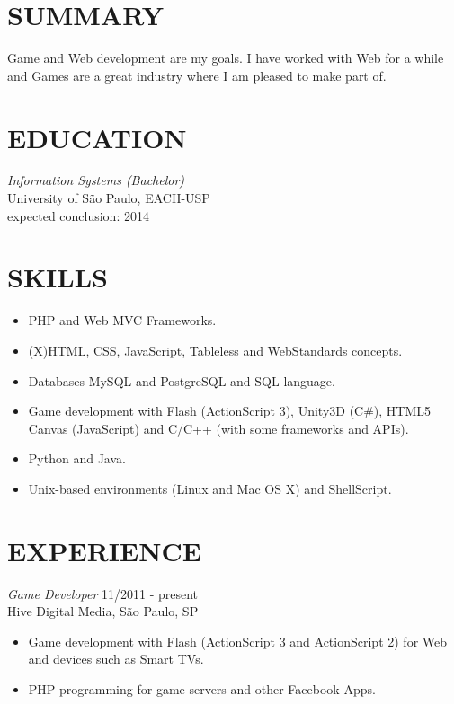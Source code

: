 \documentclass[line,margin]{res}
\begin{document}

\address{Av. Sete de Setembro, 1256 - Guarulhos - São Paulo}
\address{(11) 9932-6440 - bruno@croci.me - http://bruno.croci.me/}

 
\begin{resume}
 
\section{SUMMARY} Game and Web development are my goals. I have worked with Web for a while and Games are a great industry where I am pleased to make part of.
 
 
\section{EDUCATION} {\sl Information Systems (Bachelor)} \\
                University of São Paulo, EACH-USP \\
                expected conclusion: 2014
                
 
\section{SKILLS} \begin{itemize}  \itemsep -2pt
                 \item PHP and Web MVC Frameworks.
                 \item (X)HTML, CSS, JavaScript, Tableless and WebStandards concepts.
                 \item Databases MySQL and PostgreSQL and SQL language.
                 \item Game development with Flash (ActionScript 3), Unity3D (C\#),
                       HTML5 Canvas (JavaScript) and C/C++ (with some frameworks and APIs).
                 \item Python and Java.
                 \item Unix-based environments (Linux and Mac OS X) and ShellScript.
                 \end{itemize}
 
\section{EXPERIENCE} {\sl Game Developer} \hfill 11/2011 - present \\
                Hive Digital Media, São Paulo, SP
                 \begin{itemize}  \itemsep -2pt %
                 \item Game development with Flash (ActionScript 3 and ActionScript 2) for Web and devices such as Smart TVs.
                 \item PHP programming for game servers and other Facebook Apps.
                 \end{itemize}
                 

\end{resume}
\end{document}
